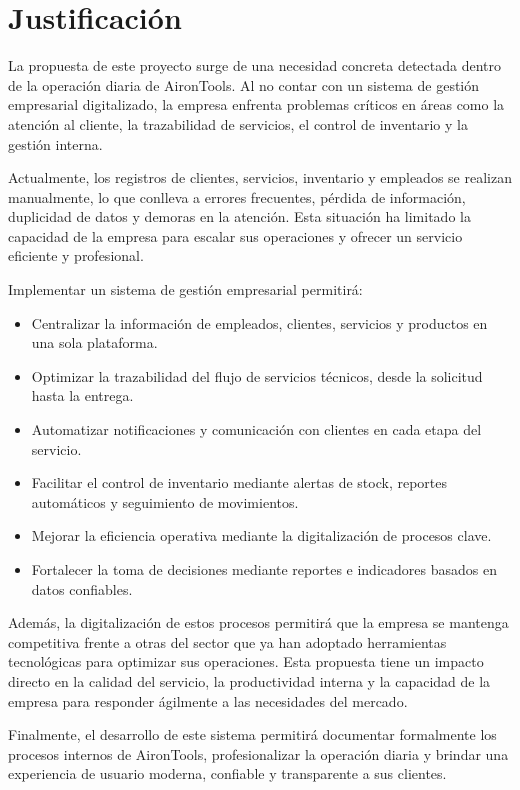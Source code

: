 \section{Justificación}

La propuesta de este proyecto surge de una necesidad concreta detectada dentro de la operación diaria de AironTools. Al no contar con un sistema de gestión empresarial digitalizado, la empresa enfrenta problemas críticos en áreas como la atención al cliente, la trazabilidad de servicios, el control de inventario y la gestión interna.

Actualmente, los registros de clientes, servicios, inventario y empleados se realizan manualmente, lo que conlleva a errores frecuentes, pérdida de información, duplicidad de datos y demoras en la atención. Esta situación ha limitado la capacidad de la empresa para escalar sus operaciones y ofrecer un servicio eficiente y profesional.

Implementar un sistema de gestión empresarial permitirá:

\begin{itemize}
    \item Centralizar la información de empleados, clientes, servicios y productos en una sola plataforma.
    \item Optimizar la trazabilidad del flujo de servicios técnicos, desde la solicitud hasta la entrega.
    \item Automatizar notificaciones y comunicación con clientes en cada etapa del servicio.
    \item Facilitar el control de inventario mediante alertas de stock, reportes automáticos y seguimiento de movimientos.
    \item Mejorar la eficiencia operativa mediante la digitalización de procesos clave.
    \item Fortalecer la toma de decisiones mediante reportes e indicadores basados en datos confiables.
\end{itemize}

Además, la digitalización de estos procesos permitirá que la empresa se mantenga competitiva frente a otras del sector que ya han adoptado herramientas tecnológicas para optimizar sus operaciones. Esta propuesta tiene un impacto directo en la calidad del servicio, la productividad interna y la capacidad de la empresa para responder ágilmente a las necesidades del mercado.

Finalmente, el desarrollo de este sistema permitirá documentar formalmente los procesos internos de AironTools, profesionalizar la operación diaria y brindar una experiencia de usuario moderna, confiable y transparente a sus clientes.

